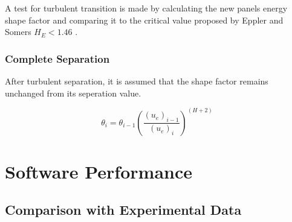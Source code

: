 \documentclass{article}
\begin{document}
A test for turbulent transition is made by calculating the new panels energy shape factor and comparing it to the critical
value proposed by Eppler and Somers $H_E < 1.46$ \cite{Eppler_Somers}.

\subsubsection{Complete Separation}

After turbulent separation, it is assumed that the shape factor remains unchanged from its seperation value.

\begin{equation}
    \theta_{i} = \theta_{i-1} \left( \frac{(u_e)_{i-1}}{(u_e)_i} \right) ^ {(H + 2)}
\end{equation}

\section{Software Performance}

\subsection{Comparison with Experimental Data}
\end{document}
